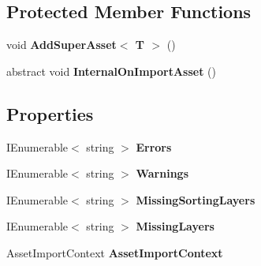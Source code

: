 \subsection*{Protected Member Functions}
\begin{DoxyCompactItemize}
\item 
\mbox{\label{class_super_tiled2_unity_1_1_editor_1_1_super_importer_a2656cd4abce0c19cccc134f1ca71bfbe}} 
void {\bfseries Add\+Super\+Asset$<$ T $>$} ()
\item 
\mbox{\label{class_super_tiled2_unity_1_1_editor_1_1_super_importer_a276719fc0c955cf4cadb22fe5e0da8c4}} 
abstract void {\bfseries Internal\+On\+Import\+Asset} ()
\end{DoxyCompactItemize}
\subsection*{Properties}
\begin{DoxyCompactItemize}
\item 
\mbox{\label{class_super_tiled2_unity_1_1_editor_1_1_super_importer_a4ef6150d22695e6e833eb12ff222d462}} 
I\+Enumerable$<$ string $>$ {\bfseries Errors}
\item 
\mbox{\label{class_super_tiled2_unity_1_1_editor_1_1_super_importer_a7453533ac68d9f646bd0b7b88d5f8fe0}} 
I\+Enumerable$<$ string $>$ {\bfseries Warnings}
\item 
\mbox{\label{class_super_tiled2_unity_1_1_editor_1_1_super_importer_aade6e115ef421c4a0eef2b4178df29b6}} 
I\+Enumerable$<$ string $>$ {\bfseries Missing\+Sorting\+Layers}
\item 
\mbox{\label{class_super_tiled2_unity_1_1_editor_1_1_super_importer_aa5ac7ae3443dbdd8d0eb214da59b35e7}} 
I\+Enumerable$<$ string $>$ {\bfseries Missing\+Layers}
\item 
\mbox{\label{class_super_tiled2_unity_1_1_editor_1_1_super_importer_a3efc43d0d65595728bef5bb0567a3bf7}} 
Asset\+Import\+Context {\bfseries Asset\+Import\+Context}
\end{DoxyCompactItemize}


